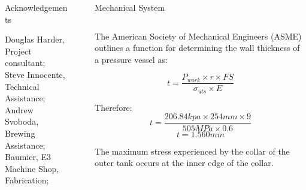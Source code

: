 \documentclass[final]{beamer}
\newlength{\sepwid}
\newlength{\onecolwid}
\newlength{\twocolwid}
\begin{document}
\begin{frame}[t]
\begin{columns}[t]
\begin{column}{\onecolwid}
\begin{alertblock}{Acknowledgements}

\small{Douglas Harder, Project consultant; \\
Steve Innocente, Technical Assistance; \\
Andrew Svoboda, Brewing Assistance; \\
Baumier, E3 Machine Shop, Fabrication;}

\end{alertblock}

\end{column} %

\begin{column}{\sepwid}\end{column} %

\begin{column}{\twocolwid} %

\begin{block}{Mechanical System} 

\begin{columns}[t,totalwidth=\twocolwid] %

\begin{column}{\onecolwid} %

\vspace{-.3in}
\begin{justify}
The American Society of Mechanical Engineers (ASME) outlines a function for determining the wall thickness of a pressure vessel as:

\begin{equation}
t = \frac{P_{work} \times r \times FS}{\sigma_{uts} \times E}
\end{equation}

\noindent Therefore:
\begin{equation}
t = \frac{206.84kpa \times 254mm \times 9}{505MPa \times 0.6}
\end{equation}
\begin{equation}
t = 1.560mm
\end{equation}

The maximum stress experienced by the collar of the outer tank occurs at the inner edge of the collar. 


\end{justify}
\end{column}
\end{columns}
\end{block}
\end{column}
\end{columns}
\end{frame}
\end{document}

